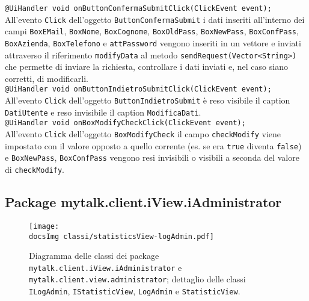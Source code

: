 {\begin{sloppypar}
{{\begin{itemize}
				\texttt{@UiHandler void onButtonConfermaSubmitClick(ClickEvent event);}\\
				All'evento \texttt{Click} dell'oggetto \texttt{ButtonConfermaSubmit} i dati inseriti all'interno dei campi \texttt{BoxEMail}, \texttt{BoxNome}, \texttt{BoxCognome}, \texttt{BoxOldPass}, \texttt{BoxNewPass}, \texttt{BoxConfPass}, \texttt{BoxAzienda}, \texttt{BoxTelefono} e \texttt{attPassword} vengono inseriti in un vettore e inviati attraverso il riferimento \texttt{modifyData} al metodo \texttt{sendRequest(Vector<String>)} che permette di inviare la richiesta, controllare i dati inviati e, nel caso siano corretti, di modificarli.\\
				
				\texttt{@UiHandler void onButtonIndietroSubmitClick(ClickEvent event);}\\
				All'evento \texttt{Click} dell'oggetto \texttt{ButtonIndietroSubmit} è reso visibile il caption \texttt{DatiUtente} e reso invisibile il caption \texttt{ModificaDati}.\\
				
				\texttt{@UiHandler void onBoxModifyCheckClick(ClickEvent event);}\\
				All'evento \texttt{Click} dell'oggetto \texttt{BoxModifyCheck} il campo \texttt{checkModify} viene impostato con il valore opposto a quello corrente (es. se era \texttt{true} diventa \texttt{false}) e \texttt{BoxNewPass}, \texttt{BoxConfPass} vengono resi invisibili o visibili a seconda del valore di \texttt{checkModify}.\\
		\end{itemize}
		}






\newpage
	\subsection{Package mytalk.client.iView.iAdministrator} {

\begin{figure}[h!tbp]
		\centering
		\texttt{[image: \\docsImg classi/statisticsView-logAdmin.pdf]}
		\caption{Diagramma delle classi dei package \nolinkurl{mytalk.client.iView.iAdministrator} e  \nolinkurl{mytalk.client.view.administrator}; dettaglio delle classi \nolinkurl{ILogAdmin},  \nolinkurl{IStatisticView}, \nolinkurl{LogAdmin} e \nolinkurl{StatisticView}.}
	\end{figure}

}}
\end{sloppypar}}
